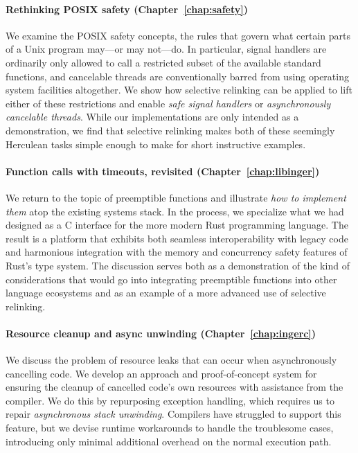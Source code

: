 \paragraph{Rethinking POSIX safety (Chapter~\ref{chap:safety})}
We examine the POSIX safety concepts, the rules that govern what certain parts of a
Unix program may---or may not---do.  In particular, signal handlers are ordinarily
only allowed to call a restricted subset of the available standard functions, and
cancelable threads are conventionally barred from using operating system facilities
altogether.  We show how selective relinking can be applied to lift either of these
restrictions and enable \textit{safe signal handlers} or \textit{asynchronously
cancelable threads}.  While our implementations are only intended as a
demonstration, we find that selective relinking makes both of these seemingly
Herculean tasks simple enough to make for short instructive examples.

\paragraph{Function calls with timeouts, revisited (Chapter~\ref{chap:libinger})}
We return to the topic of preemptible functions and illustrate \textit{how to
implement them}
atop the existing systems stack.  In the process, we specialize what we had designed
as a C interface for the more modern Rust programming language.  The result is a
platform that exhibits both seamless interoperability with legacy code and harmonious
integration with the memory and concurrency safety features of Rust's type system.
The discussion serves both as a demonstration of the kind of considerations that
would go into integrating preemptible functions into other language ecosystems and as
an example of a more advanced use of selective relinking.

\paragraph{Resource cleanup and async unwinding (Chapter~\ref{chap:ingerc})}
We discuss the problem of resource leaks that can occur when asynchronously
cancelling code.  We develop an approach and proof-of-concept system for ensuring the
cleanup of cancelled code's own resources with assistance from the compiler.  We do
this by repurposing exception handling, which requires us to repair
\textit{asynchronous stack unwinding}.  Compilers have struggled to support this
feature, but we devise runtime workarounds to handle the troublesome cases,
introducing only minimal additional overhead on the normal execution path.

